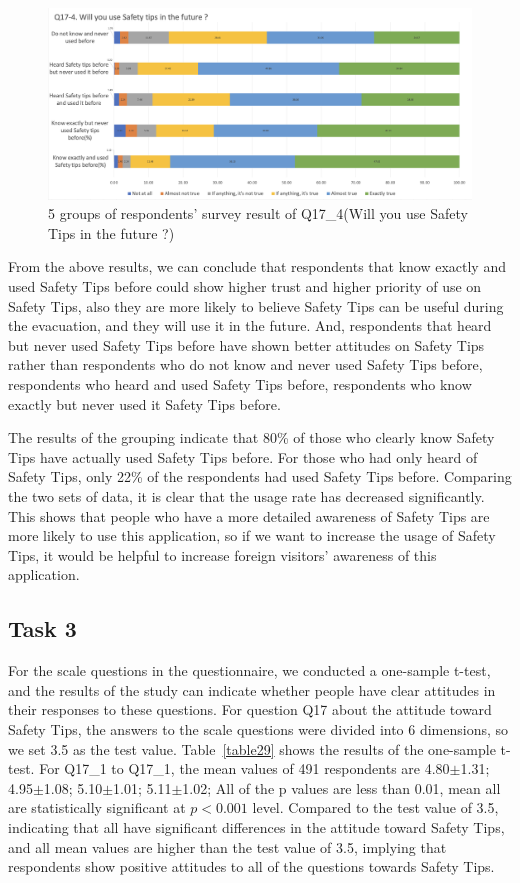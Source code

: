 \begin{figure}[h]
  \includegraphics[width=0.8\linewidth]{Figure/Figure22.jpg}
  \centering
  \caption[5 groups of respondents' survey result of Q17\_4]{5 groups of respondents' survey result of Q17\_4(Will you use Safety Tips in the future ?)}
  \label{fig22}
\end{figure}

From the above results, we can conclude that respondents that know exactly and used Safety Tips before could show higher trust and higher priority of use on Safety Tips, also they are more likely to believe Safety Tips can be useful during the evacuation, and they will use it in the future. And, respondents that heard but never used  Safety Tips before have shown better attitudes on Safety Tips rather than respondents who do not know and never used  Safety Tips before, respondents who heard and used Safety Tips before, respondents who know exactly but never used it Safety Tips before.

The results of the grouping indicate that 80\% of those who clearly know Safety Tips have actually used Safety Tips before. For those who had only heard of Safety Tips, only 22\% of the respondents had used Safety Tips before. Comparing the two sets of data, it is clear that the usage rate has decreased significantly. This shows that people who have a more detailed awareness of Safety Tips are more likely to use this application, so if we want to increase the usage of Safety Tips, it would be helpful to increase foreign visitors' awareness of this application.

\subsection{Task 3}
\label{task3}
For the scale questions in the questionnaire, we conducted a one-sample t-test, and the results of the study can indicate whether people have clear attitudes in their responses to these questions. For question Q17 about the attitude toward Safety Tips, the answers to the scale questions were divided into 6 dimensions, so we set 3.5 as the test value. Table~\ref{table29} shows the results of the one-sample t-test. For Q17\_1 to Q17\_1, the mean values of 491 respondents are 4.80$\pm$1.31; 4.95$\pm$1.08; 5.10$\pm$1.01; 5.11$\pm$1.02; All of the p values are less than 0.01, mean all are statistically significant at $p<0.001$ level. Compared to the test value of 3.5, indicating that all have significant differences in the attitude toward Safety Tips, and all mean values are higher than the test value of 3.5, implying that respondents show positive attitudes to all of the questions towards Safety Tips. 

